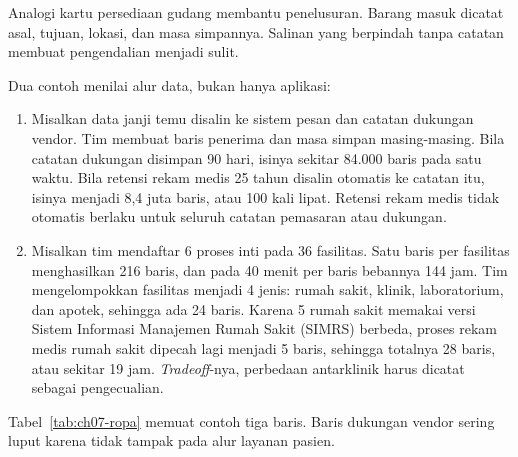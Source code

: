 Analogi kartu persediaan gudang membantu penelusuran. Barang masuk dicatat asal, tujuan, lokasi, dan
masa simpannya. Salinan yang berpindah tanpa catatan membuat pengendalian menjadi sulit.

Dua contoh menilai alur data, bukan hanya aplikasi:
\begin{enumerate}
  \item Misalkan data janji temu disalin ke sistem pesan dan catatan dukungan vendor. Tim membuat
  baris penerima dan masa simpan masing-masing. Bila catatan dukungan disimpan 90 hari, isinya
  sekitar 84.000 baris pada satu waktu. Bila retensi rekam medis 25 tahun disalin otomatis ke
  catatan itu, isinya menjadi 8,4 juta baris, atau 100 kali lipat. Retensi rekam medis tidak
  otomatis berlaku untuk seluruh catatan pemasaran atau dukungan.
  \item Misalkan tim mendaftar 6 proses inti pada 36 fasilitas. Satu baris per fasilitas
  menghasilkan 216 baris, dan pada 40 menit per baris bebannya 144 jam. Tim mengelompokkan fasilitas
  menjadi 4 jenis: rumah sakit, klinik, laboratorium, dan apotek, sehingga ada 24 baris. Karena 5
  rumah sakit memakai versi Sistem Informasi Manajemen Rumah Sakit (SIMRS) berbeda, proses rekam
  medis rumah sakit dipecah lagi menjadi 5 baris, sehingga totalnya 28 baris, atau sekitar 19 jam.
  \textit{Tradeoff}-nya, perbedaan antarklinik harus dicatat sebagai pengecualian.
\end{enumerate}

Tabel~\ref{tab:ch07-ropa} memuat contoh tiga baris. Baris dukungan vendor sering luput karena tidak
tampak pada alur layanan pasien.

